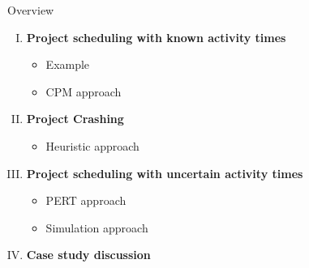 \documentclass[11pt,aspectratio=169]{beamer}
\begin{document}
\begin{frame}{Overview}
    \begin{enumerate}[I.]
        \item \textbf{Project scheduling with known activity times}
        \begin{itemize}
            \item Example
            \item CPM approach
        \end{itemize}
        \vspace{1em}
        \item \textbf{Project Crashing}
        \begin{itemize}
            \item Heuristic approach
        \end{itemize}
        \vspace{1em}
        \item \textbf{Project scheduling with uncertain activity times}
        \begin{itemize}
            \item PERT approach
            \item Simulation approach
        \end{itemize}
        \vspace{1em}
        \item \textbf{Case study discussion}
    \end{enumerate}
\end{frame}
\end{document}
